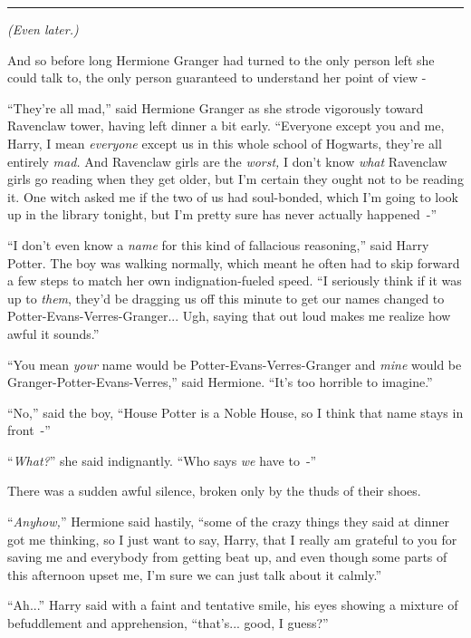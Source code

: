 \begin{center}\rule{3in}{0.4pt}\end{center}

\emph{(Even later.)}

And so before long Hermione Granger had turned to the only person left she could talk to, the only person guaranteed to understand her point of view -

``They're all mad,'' said Hermione Granger as she strode vigorously toward Ravenclaw tower, having left dinner a bit early. ``Everyone except you and me, Harry, I mean \emph{everyone} except us in this whole school of Hogwarts, they're all entirely \emph{mad.} And Ravenclaw girls are the \emph{worst,} I don't know \emph{what} Ravenclaw girls go reading when they get older, but I'm certain they ought not to be reading it. One witch asked me if the two of us had soul-bonded, which I'm going to look up in the library tonight, but I'm pretty sure has never actually happened~-''

``I don't even know a \emph{name} for this kind of fallacious reasoning,'' said Harry Potter. The boy was walking normally, which meant he often had to skip forward a few steps to match her own indignation-fueled speed. ``I seriously think if it was up to \emph{them}, they'd be dragging us off this minute to get our names changed to Potter-Evans-Verres-Granger... Ugh, saying that out loud makes me realize how awful it sounds.''

``You mean \emph{your} name would be Potter-Evans-Verres-Granger and \emph{mine} would be Granger-Potter-Evans-Verres,'' said Hermione. ``It's too horrible to imagine.''

``No,'' said the boy, ``House Potter is a Noble House, so I think that name stays in front~-''

``\emph{What?}'' she said indignantly. ``Who says \emph{we} have to~-''

There was a sudden awful silence, broken only by the thuds of their shoes.

``\emph{Anyhow,}'' Hermione said hastily, ``some of the crazy things they said at dinner got me thinking, so I just want to say, Harry, that I really am grateful to you for saving me and everybody from getting beat up, and even though some parts of this afternoon upset me, I'm sure we can just talk about it calmly.''

``Ah...'' Harry said with a faint and tentative smile, his eyes showing a mixture of befuddlement and apprehension, ``that's... good, I guess?''

